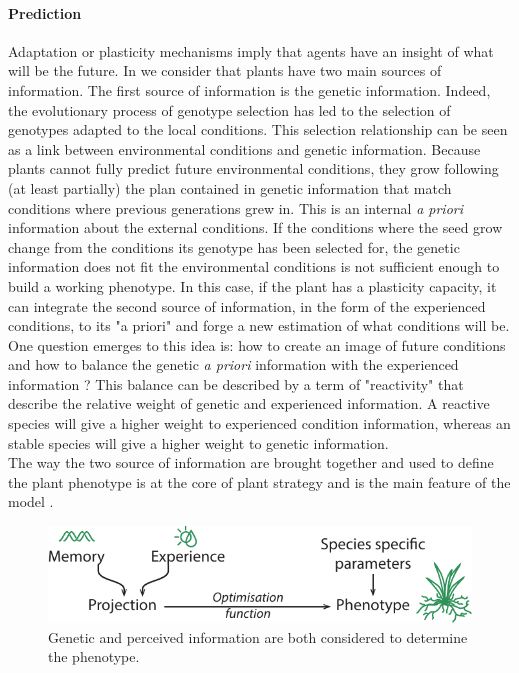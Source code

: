 \paragraph{Prediction} Adaptation or plasticity mechanisms imply that agents have an insight of what will be the future. In \model we consider that plants have two main sources of information. The first source of information is the genetic information. Indeed, the evolutionary process of genotype selection has led to the selection of genotypes adapted to the local conditions. This selection relationship can be seen as a link between environmental conditions and genetic information. Because plants cannot fully predict future environmental conditions, they grow following (at least partially) the plan contained in genetic information that match conditions where previous generations grew in.  This is an internal \textit{a priori} information about the external conditions. If the conditions where the seed grow change from the conditions its genotype has been selected for, the genetic information does not fit the environmental conditions is not sufficient enough to build a working phenotype. In this case, if the plant has a plasticity capacity, it can integrate the second source of information, in the form of the experienced conditions, to its "a priori" and forge a new estimation of what conditions will be. One question emerges to this idea is: how to create an image of future conditions and how to balance the genetic \textit{a priori} information with the experienced information ? This balance can be described by a term of "reactivity" that describe the relative weight of genetic and experienced information. A reactive species will give a higher weight to experienced condition information, whereas an stable species will give a higher weight to genetic information.\\
\indent The way the two source of information are brought together and used to define the plant phenotype is at the core of plant strategy and is the main feature of the model \model.
\begin{figure}
\includegraphics{./Figures/memory2phenotype_t.pdf}
\caption{Genetic and perceived information are both considered to determine the phenotype.}
\end{figure}
